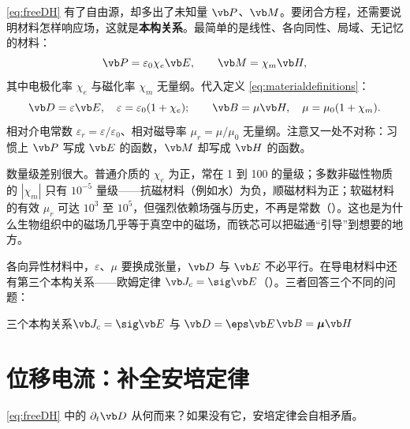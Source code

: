 \eqref{eq:freeDH} 有了自由源，却多出了未知量 $\vb P$、$\vb M$。要闭合方程，还需要说明材料怎样响应场，这就是\textbf{本构关系}。最简单的是线性、各向同性、局域、无记忆的材料：
\begin{equation}
\vb P=\varepsilon_0\chi_e\vb E,\qquad \vb M=\chi_m\vb H,
\label{eq:susceptibility}
\end{equation}
其中电极化率 $\chi_e$ 与磁化率 $\chi_m$ 无量纲。代入定义 \eqref{eq:materialdefinitions}：
\begin{equation}
\vb D=\varepsilon\vb E,\quad \varepsilon=\varepsilon_0(1+\chi_e);\qquad
\vb B=\mu\vb H,\quad \mu=\mu_0(1+\chi_m).
\end{equation}
相对介电常数 $\varepsilon_r=\varepsilon/\varepsilon_0$、相对磁导率 $\mu_r=\mu/\mu_0$ 无量纲。注意又一处不对称：习惯上 $\vb P$ 写成 $\vb E$ 的函数，$\vb M$ 却写成 $\vb H$ 的函数。

数量级差别很大。普通介质的 $\chi_e$ 为正，常在 1 到 100 的量级；多数非磁性物质的 $|\chi_m|$ 只有 $10^{-5}$ 量级——抗磁材料（例如水）为负，顺磁材料为正\cite{griffiths}；软磁材料的有效 $\mu_r$ 可达 $10^3$ 至 $10^5$\cite{fitzgerald}，但强烈依赖场强与历史，不再是常数（）。这也是为什么生物组织中的磁场几乎等于真空中的磁场，而铁芯可以把磁通“引导”到想要的地方。

各向异性材料中，$\varepsilon$、$\mu$ 要换成张量，$\vb D$ 与 $\vb E$ 不必平行。在导电材料中还有第三个本构关系——欧姆定律 $\vb J_c=\sig\vb E$（）。三者回答三个不同的问题：

\begin{compare}{三个本构关系}{$\vb J_c=\sig\vb E$ 与 $\vb D=\eps\vb E$}{$\vb B=\boldsymbol\mu\vb H$}
\end{compare}

\section{位移电流：补全安培定律}\label{sec:matter-displacement}

\eqref{eq:freeDH} 中的 $\partial_t\vb D$ 从何而来？如果没有它，安培定律会自相矛盾。

